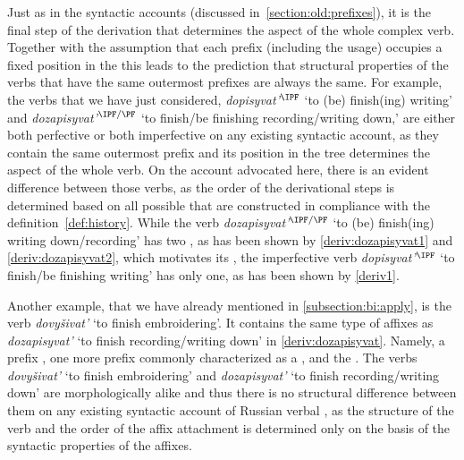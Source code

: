 Just as in the syntactic accounts (discussed in~\ref{section:old:prefixes}), it is the final step of the derivation that determines the aspect of the whole complex verb. Together with the assumption that each prefix (including the usage) occupies a fixed position in the  this leads to the prediction that structural properties of the verbs that have the same outermost prefixes are always the same. For example, the verbs that we have just considered, \textit{dopisyvat'}$^\IPF$ `to (be) finish(ing) writing' and \textit{dozapisyvat'}$^{\IPF/\PF}$ `to finish/be finishing recording/writing down,' are either both perfective or both imperfective on any existing syntactic  account, as they contain the same outermost prefix  and its position in the tree determines the aspect of the whole verb. On the account advocated here, there is an evident difference between those verbs, as the order of the derivational steps is determined based on all possible  that are constructed in compliance with the definition~\ref{def:history}. While the verb \textit{dozapisyvat'}$^{\IPF/\PF}$ `to (be) finish(ing) writing down/recording' has two , as has been shown by \ref{deriv:dozapisyvat1} and \ref{deriv:dozapisyvat2}, which motivates its , the imperfective verb \textit{dopisyvat'}$^\IPF$ `to finish/be finishing writing' has only one, as has been shown by \ref{deriv1}.

Another example, that we have already mentioned in \ref{subsection:bi:apply}, is the verb \textit{dovy\v{s}ivat'} `to finish embroidering'. It contains the same type of affixes as \textit{dozapisyvat'} `to finish recording/writing down' in \ref{deriv:dozapisyvat}. Namely, a  prefix , one more prefix commonly characterized as a , and the . The verbs \textit{dovy\v{s}ivat'} `to finish embroidering' and \textit{dozapisyvat'} `to finish recording/writing down' are morphologically alike and thus there is no structural difference between them on any existing syntactic account of Russian verbal , as the structure of the verb and the order of the affix attachment is determined only on the basis of the syntactic properties of the affixes.
 
